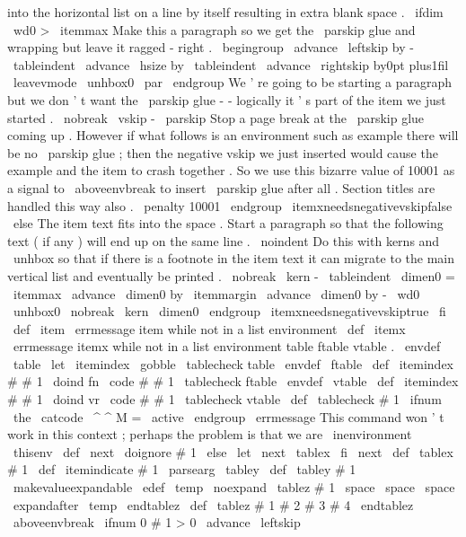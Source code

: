 {{into
the
%
horizontal
list
on
a
line
by
itself
resulting
in
extra
blank
space
.
\
ifdim
\
wd0
>
\
itemmax
%
%
Make
this
a
paragraph
so
we
get
the
\
parskip
glue
and
wrapping
%
but
leave
it
ragged
-
right
.
\
begingroup
\
advance
\
leftskip
by
-
\
tableindent
\
advance
\
hsize
by
\
tableindent
\
advance
\
rightskip
by0pt
plus1fil
\
leavevmode
\
unhbox0
\
par
\
endgroup
%
%
We
'
re
going
to
be
starting
a
paragraph
but
we
don
'
t
want
the
%
\
parskip
glue
-
-
logically
it
'
s
part
of
the
item
we
just
started
.
\
nobreak
\
vskip
-
\
parskip
%
%
Stop
a
page
break
at
the
\
parskip
glue
coming
up
.
However
if
%
what
follows
is
an
environment
such
as
example
there
will
be
no
%
\
parskip
glue
;
then
the
negative
vskip
we
just
inserted
would
%
cause
the
example
and
the
item
to
crash
together
.
So
we
use
this
%
bizarre
value
of
10001
as
a
signal
to
\
aboveenvbreak
to
insert
%
\
parskip
glue
after
all
.
Section
titles
are
handled
this
way
also
.
%
\
penalty
10001
\
endgroup
\
itemxneedsnegativevskipfalse
\
else
%
The
item
text
fits
into
the
space
.
Start
a
paragraph
so
that
the
%
following
text
(
if
any
)
will
end
up
on
the
same
line
.
\
noindent
%
Do
this
with
kerns
and
\
unhbox
so
that
if
there
is
a
footnote
in
%
the
item
text
it
can
migrate
to
the
main
vertical
list
and
%
eventually
be
printed
.
\
nobreak
\
kern
-
\
tableindent
\
dimen0
=
\
itemmax
\
advance
\
dimen0
by
\
itemmargin
\
advance
\
dimen0
by
-
\
wd0
\
unhbox0
\
nobreak
\
kern
\
dimen0
\
endgroup
\
itemxneedsnegativevskiptrue
\
fi
}
\
def
\
item
{
\
errmessage
{
item
while
not
in
a
list
environment
}
}
\
def
\
itemx
{
\
errmessage
{
itemx
while
not
in
a
list
environment
}
}
%
table
ftable
vtable
.
\
envdef
\
table
{
%
\
let
\
itemindex
\
gobble
\
tablecheck
{
table
}
%
}
\
envdef
\
ftable
{
%
\
def
\
itemindex
#
#
1
{
\
doind
{
fn
}
{
\
code
{
#
#
1
}
}
}
%
\
tablecheck
{
ftable
}
%
}
\
envdef
\
vtable
{
%
\
def
\
itemindex
#
#
1
{
\
doind
{
vr
}
{
\
code
{
#
#
1
}
}
}
%
\
tablecheck
{
vtable
}
%
}
\
def
\
tablecheck
#
1
{
%
\
ifnum
\
the
\
catcode
\
^
^
M
=
\
active
\
endgroup
\
errmessage
{
This
command
won
'
t
work
in
this
context
;
perhaps
the
problem
is
that
we
are
\
inenvironment
\
thisenv
}
%
\
def
\
next
{
\
doignore
{
#
1
}
}
%
\
else
\
let
\
next
\
tablex
\
fi
\
next
}
\
def
\
tablex
#
1
{
%
\
def
\
itemindicate
{
#
1
}
%
\
parsearg
\
tabley
}
\
def
\
tabley
#
1
{
%
{
%
\
makevalueexpandable
\
edef
\
temp
{
\
noexpand
\
tablez
#
1
\
space
\
space
\
space
}
%
\
expandafter
}
\
temp
\
endtablez
}
\
def
\
tablez
#
1
#
2
#
3
#
4
\
endtablez
{
%
\
aboveenvbreak
\
ifnum
0
#
1
>
0
\
advance
\
leftskip
}}
